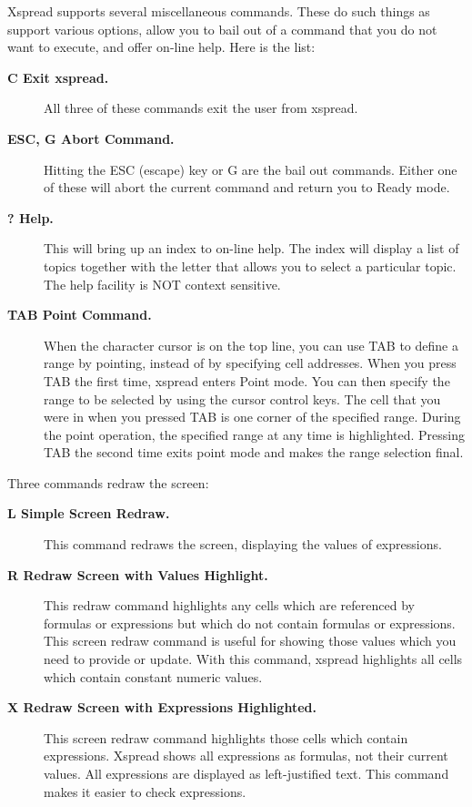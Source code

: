     Xspread supports several miscellaneous commands.  These do such things as 
support various options, allow you to bail out of a command that you do not 
want to execute, and offer on-line help.  Here is the list:
\begin{description}
\item[{\bf \ctrl C  Exit xspread.}]{  All three of these commands exit the user from
       xspread.}

\item[{\bf  ESC, \ctrl G  Abort Command.}]{  Hitting the ESC (escape) key
    or \ctrl G are the bail out
    commands.  Either one of these will abort the current command and 
    return you to Ready mode.}

\item[{\bf ?   Help.}]{  This will bring up an index to on-line help.  The index will
display a list of topics together with the letter that allows you to 
select a particular topic.  The help facility is NOT context 
sensitive.}

\item[{\bf TAB Point Command.}]{  When the character cursor is on the top line, you can
use TAB to define a range by pointing, instead of by specifying cell 
addresses.  When you press TAB the first time, xspread enters Point 
mode.  You can then specify the range to be selected by using the 
cursor control keys.  The cell that you were in when you pressed TAB 
is one corner of the specified range.  During the point operation, the 
specified range at any time is highlighted.  Pressing TAB the second 
time exits point mode and makes the range selection final.}
\end{description}

Three commands redraw the screen:
\begin{description}
\item[{\bf \ctrl L  Simple Screen Redraw.}]{  This command redraws the screen, 
displaying the
values of expressions.}

\item[{\bf \ctrl R  Redraw Screen with Values Highlight.}]{  This redraw 
command
highlights any cells which are referenced by formulas or expressions 
but which do not contain formulas or expressions.  This screen redraw 
command is useful for showing those values which you need to provide 
or update.  With this command, xspread highlights all cells which 
contain constant numeric values.} 

\item[{\bf \ctrl X  Redraw Screen with Expressions Highlighted.}]{  This screen 
redraw
command highlights those cells which contain expressions.  Xspread 
shows all expressions as formulas, not their current values.  All 
expressions are displayed as left-justified text.  This command makes 
it easier to check expressions.}
\end{description}

